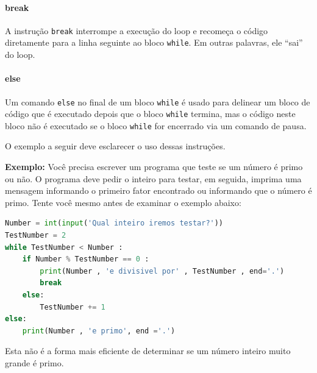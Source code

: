 \paragraph{break} A instrução {\tt break} interrompe a execução do loop e recomeça o código diretamente para a linha seguinte ao bloco {\tt while}. Em outras palavras, ele ``sai'' do loop.

\paragraph{else} Um comando {\tt else} no final de um bloco {\tt while} é usado para delinear um bloco de código que é executado depois que o bloco {\tt while} termina, mas
o código neste bloco não é executado se o bloco {\tt while} for encerrado via
um comando de pausa.

O exemplo a seguir deve esclarecer o uso dessas instruções.

{\bf Exemplo:} Você precisa escrever um programa que teste se um número é
primo ou não. O programa deve pedir o inteiro para testar, em seguida, imprima uma mensagem informando o primeiro fator encontrado ou informando que o número é primo. Tente você mesmo antes de examinar o exemplo abaixo:

\begin{lstlisting}[language=Python, frame=lines,basicstyle=\footnotesize, caption={Testando se um número é primo}, label={lst:isprime}]
Number = int(input('Qual inteiro iremos testar?'))
TestNumber = 2
while TestNumber < Number :
    if Number % TestNumber == 0 :
        print(Number , 'e divisivel por' , TestNumber , end='.')
        break
    else:
        TestNumber += 1
else:
    print(Number , 'e primo', end ='.')
\end{lstlisting}
Esta não é a forma mais eficiente de determinar se um número inteiro muito grande é primo.

